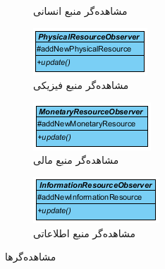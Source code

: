 \begin{figure}[H]
\begin{subfigure}[b]{0.2\textwidth}
		\caption{مشاهده‌گر منبع انسانی}
	\end{subfigure}
	\begin{subfigure}[b]{0.2\textwidth}
		\includegraphics[width=\textwidth]{img/class-design/ui/PhysicalResourceObserver}
		\caption{مشاهده‌گر منبع فیزیکی}
	\end{subfigure}	
	\begin{subfigure}[b]{0.2\textwidth}
		\includegraphics[width=\textwidth]{img/class-design/ui/MonetaryResourceObserver}
		\caption{مشاهده‌گر منبع مالی}
	\end{subfigure}
	\begin{subfigure}[b]{0.2\textwidth}
		\includegraphics[width=\textwidth]{img/class-design/ui/InformationResourceObserver}
		\caption{مشاهده‌گر منبع اطلاعاتی}
	\end{subfigure}
	\caption{مشاهده‌گرها}
\end{figure}



